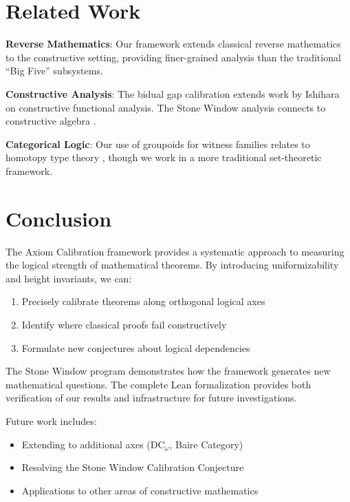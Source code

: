\documentclass[11pt]{article}
\begin{document}
\section{Related Work}

\textbf{Reverse Mathematics}: Our framework extends classical reverse mathematics \cite{Simpson} to the constructive setting, providing finer-grained analysis than the traditional ``Big Five'' subsystems.

\textbf{Constructive Analysis}: The bidual gap calibration extends work by Ishihara \cite{Ishihara} on constructive functional analysis. The Stone Window analysis connects to constructive algebra \cite{Mines}.

\textbf{Categorical Logic}: Our use of groupoids for witness families relates to homotopy type theory \cite{HoTT}, though we work in a more traditional set-theoretic framework.

\section{Conclusion}

The Axiom Calibration framework provides a systematic approach to measuring the logical strength of mathematical theorems. By introducing uniformizability and height invariants, we can:

\begin{enumerate}
\item Precisely calibrate theorems along orthogonal logical axes
\item Identify where classical proofs fail constructively
\item Formulate new conjectures about logical dependencies
\end{enumerate}

The Stone Window program demonstrates how the framework generates new mathematical questions. The complete Lean formalization provides both verification of our results and infrastructure for future investigations.

Future work includes:
\begin{itemize}
\item Extending to additional axes (DC$_\omega$, Baire Category)
\item Resolving the Stone Window Calibration Conjecture
\item Applications to other areas of constructive mathematics
\end{itemize}
\end{document}
